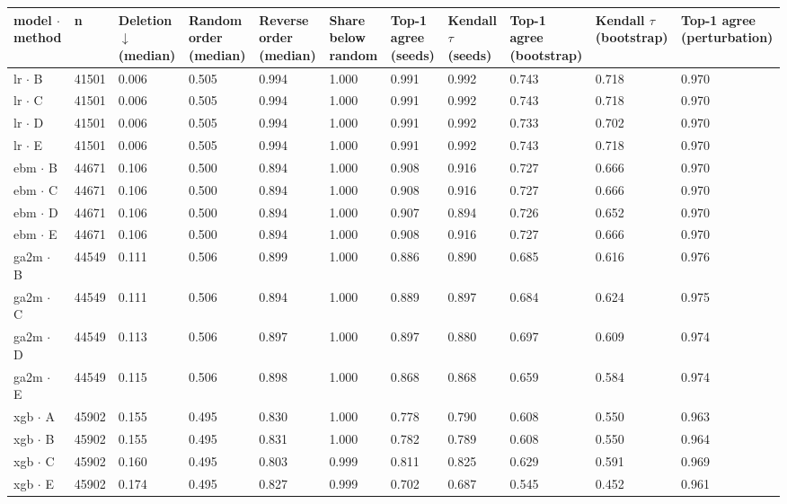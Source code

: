 \begin{tabular}{lllllllllll}
\hline
model $\cdot$ method & n & Deletion $\downarrow$ (median) & Random order (median) & Reverse order (median) & Share below random & Top-1 agree (seeds) & Kendall $\tau$ (seeds) & Top-1 agree (bootstrap) & Kendall $\tau$ (bootstrap) & Top-1 agree (perturbation) \\
\hline
lr $\cdot$ B & 41501 & 0.006 & 0.505 & 0.994 & 1.000 & 0.991 & 0.992 & 0.743 & 0.718 & 0.970 \\
lr $\cdot$ C & 41501 & 0.006 & 0.505 & 0.994 & 1.000 & 0.991 & 0.992 & 0.743 & 0.718 & 0.970 \\
lr $\cdot$ D & 41501 & 0.006 & 0.505 & 0.994 & 1.000 & 0.991 & 0.992 & 0.733 & 0.702 & 0.970 \\
lr $\cdot$ E & 41501 & 0.006 & 0.505 & 0.994 & 1.000 & 0.991 & 0.992 & 0.743 & 0.718 & 0.970 \\
ebm $\cdot$ B & 44671 & 0.106 & 0.500 & 0.894 & 1.000 & 0.908 & 0.916 & 0.727 & 0.666 & 0.970 \\
ebm $\cdot$ C & 44671 & 0.106 & 0.500 & 0.894 & 1.000 & 0.908 & 0.916 & 0.727 & 0.666 & 0.970 \\
ebm $\cdot$ D & 44671 & 0.106 & 0.500 & 0.894 & 1.000 & 0.907 & 0.894 & 0.726 & 0.652 & 0.970 \\
ebm $\cdot$ E & 44671 & 0.106 & 0.500 & 0.894 & 1.000 & 0.908 & 0.916 & 0.727 & 0.666 & 0.970 \\
ga2m $\cdot$ B & 44549 & 0.111 & 0.506 & 0.899 & 1.000 & 0.886 & 0.890 & 0.685 & 0.616 & 0.976 \\
ga2m $\cdot$ C & 44549 & 0.111 & 0.506 & 0.894 & 1.000 & 0.889 & 0.897 & 0.684 & 0.624 & 0.975 \\
ga2m $\cdot$ D & 44549 & 0.113 & 0.506 & 0.897 & 1.000 & 0.897 & 0.880 & 0.697 & 0.609 & 0.974 \\
ga2m $\cdot$ E & 44549 & 0.115 & 0.506 & 0.898 & 1.000 & 0.868 & 0.868 & 0.659 & 0.584 & 0.974 \\
xgb $\cdot$ A & 45902 & 0.155 & 0.495 & 0.830 & 1.000 & 0.778 & 0.790 & 0.608 & 0.550 & 0.963 \\
xgb $\cdot$ B & 45902 & 0.155 & 0.495 & 0.831 & 1.000 & 0.782 & 0.789 & 0.608 & 0.550 & 0.964 \\
xgb $\cdot$ C & 45902 & 0.160 & 0.495 & 0.803 & 0.999 & 0.811 & 0.825 & 0.629 & 0.591 & 0.969 \\
xgb $\cdot$ E & 45902 & 0.174 & 0.495 & 0.827 & 0.999 & 0.702 & 0.687 & 0.545 & 0.452 & 0.961 \\

\end{tabular}
